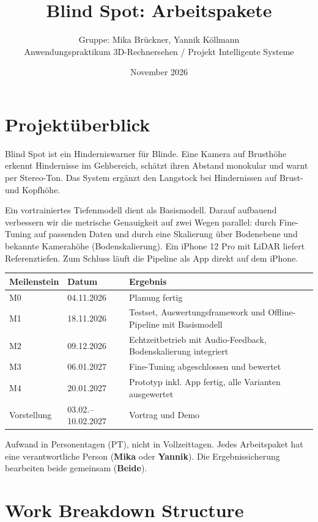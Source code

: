 \documentclass[11pt,a4paper]{article}
\title{Blind Spot: Arbeitspakete}
\author{Gruppe: Mika Brückner, Yannik Köllmann\\[0.3em]
  \small Anwendungspraktikum 3D-Rechnersehen / Projekt \glqq Intelligente Systeme\grqq}
\date{November 2026}
\newcommand{\mika}{\textcolor{mika}{\textbf{Mika}}}
\newcommand{\yannik}{\textcolor{yannik}{\textbf{Yannik}}}
\newcommand{\beide}{\textcolor{beide}{\textbf{Beide}}}
\begin{document}
\maketitle

\section*{Projektüberblick}

Blind Spot ist ein Hinderniswarner für Blinde. Eine Kamera auf Brusthöhe erkennt
Hindernisse im Gehbereich, schätzt ihren Abstand monokular und warnt per Stereo-Ton.
Das System ergänzt den Langstock bei Hindernissen auf Brust- und Kopfhöhe.

Ein vortrainiertes Tiefenmodell dient als Basismodell. Darauf aufbauend verbessern wir
die metrische Genauigkeit auf zwei Wegen parallel: durch Fine-Tuning auf passenden Daten
und durch eine Skalierung über Bodenebene und bekannte Kamerahöhe (Bodenskalierung).
Ein iPhone 12 Pro mit LiDAR liefert Referenztiefen. Zum Schluss läuft die Pipeline
als App direkt auf dem iPhone.

\begin{center}
\begin{tabularx}{\linewidth}{@{}llX@{}}
  \toprule
  Meilenstein & Datum & Ergebnis \\
  \midrule
  M0 & 04.11.2026 & Planung fertig \\
  M1 & 18.11.2026 & Testset, Auswertungsframework und Offline-Pipeline mit Basismodell \\
  M2 & 09.12.2026 & Echtzeitbetrieb mit Audio-Feedback, Bodenskalierung integriert \\
  M3 & 06.01.2027 & Fine-Tuning abgeschlossen und bewertet \\
  M4 & 20.01.2027 & Prototyp inkl. App fertig, alle Varianten ausgewertet \\
  Vorstellung & 03.02.--10.02.2027 & Vortrag und Demo \\
  \bottomrule
\end{tabularx}
\end{center}

Aufwand in Personentagen (PT), nicht in Vollzeittagen. Jedes Arbeitspaket hat eine
verantwortliche Person (\mika{} oder \yannik). Die Ergebnissicherung bearbeiten
beide gemeinsam (\beide).


\clearpage
\section{Work Breakdown Structure}
\end{document}
